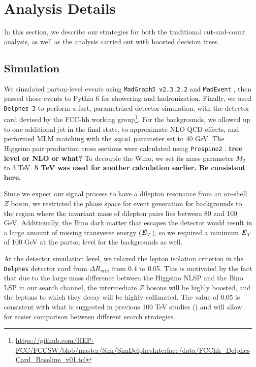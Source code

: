 \documentclass[a4paper,11pt]{article}
\newcommand{\Shufang}[1]{{\bf\color{Maroon}  #1}}
\newcommand{\met}{{\slashed{E}_T}}
\begin{document}
\section{Analysis Details}\label{sec:analysis}

In this section, we  describe our strategies for both the traditional
cut-and-count analysis, as well as the analysis carried out with boosted
decision trees. 

\subsection{Simulation}\label{simulation}

We simulated parton-level events using \texttt{MadGraph5 v2.3.2.2} and
\texttt{MadEvent} \citep{Alwall:2014hca}, then passed those events to Pythia 6
\citep{Sjostrand:2006za} for showering and hadronization. Finally, we used
\texttt{Delphes 3} \citep{deFavereau:2013fsa} to perform a fast, parametrized
detector simulation, with the detector card devised by the FCC-hh working
group\footnote{\url{https://github.com/HEP-FCC/FCCSW/blob/master/Sim/SimDelphesInterface/data/FCChh_DelphesCard_Baseline_v01.tcl}}.
For the backgrounds, we allowed up to one additional jet in the final state, to
approximate NLO QCD effects, and performed MLM matching with the \texttt{xqcut}
parameter set to 40 GeV. The Higgsino pair production cross sections were
calculated using \texttt{Prospino2} \citep{Beenakker:1999xh}. \Shufang{tree level or NLO or what?}  To decouple the
Wino, we set its mass parameter $M_2$ to 3 TeV.  \Shufang{5 TeV was used for another calculation earlier.  Be consistent here.}

Since we expect our signal process to have a dilepton resonance from an on-shell
$Z$ boson, we restricted the phase space for event generation for backgrounds to
the region where the invariant mass of dilepton pairs lies between 80 and 100
GeV. Additionally, the Bino dark matter that escapes the detector would result
in a large amount of missing transverse energy ($\met$), so we required
a minimum $\met$ of 100 GeV at the parton level for the backgrounds as
well. 

At the detector simulation level, we relaxed the lepton isolation criterion in the
\texttt{Delphes} detector card from $\Delta R_{min}$ from 0.4 to 0.05. This is
motivated by the fact that due to the large mass difference between the Higgsino
NLSP and the Bino LSP in our search channel, the intermediate $Z$ bosons will be
highly boosted, and the leptons to which they decay will be highly collimated.
The value of 0.05 is consistent with what is suggested in previous 100 TeV
studies (\citep{Acharya:2014pua,Gori:2014oua,Bramante:2014tba}) and will allow
for easier comparison between different search strategies.
\end{document}
